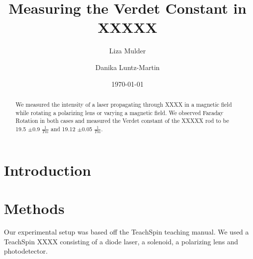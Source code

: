 \documentclass[prb,preprint]{revtex4-1}
\begin{document}

\title{Measuring the Verdet Constant in XXXXX}


\author{Liza Mulder}


\author{Danika Luntz-Martin}


\date{\today}



\begin{abstract}

We measured the intensity of a laser propagating through XXXX in a magnetic field while rotating a polarizing lens or varying a magnetic field.  We observed Faraday Rotation in both cases and measured the Verdet  constant of the XXXXX rod to be 19.5 $\pm$0.9 $\frac{1}{Tm}$ and 19.12 $\pm$0.05 $\frac{1}{Tm}$.

\end{abstract}

\maketitle %


\section{Introduction} %

\section{Methods}

Our experimental setup was based off the TeachSpin teaching manual. We used a TeachSpin XXXX consisting of a diode laser, a solenoid, a polarizing lens and photodetector. 
\end{document}
